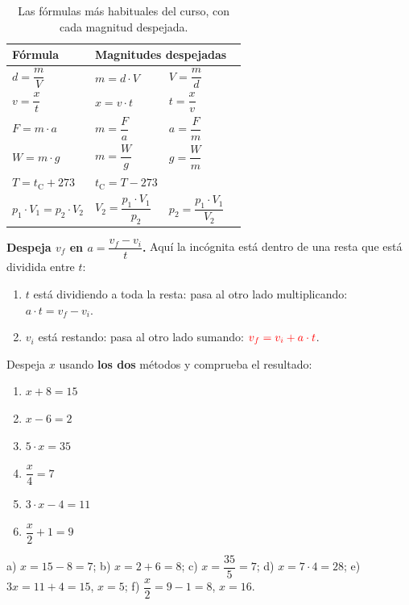 \begin{table}[H]
    \centering
    \renewcommand{\arraystretch}{2.2}
    \begin{tabular}{llll}
        \toprule
        \textbf{Fórmula} & \multicolumn{3}{l}{\textbf{Magnitudes despejadas}} \\
        \midrule
         \(d = \dfrac{m}{V}\) & \(m = d \cdot V\) & \(V = \dfrac{m}{d}\) & \\
        \(v = \dfrac{x}{t}\) & \(x = v \cdot t\) & \(t = \dfrac{x}{v}\) & \\
        \(F = m \cdot a\) & \(m = \dfrac{F}{a}\) & \(a = \dfrac{F}{m}\) & \\
        \(W = m \cdot g\) & \(m = \dfrac{W}{g}\) & \(g = \dfrac{W}{m}\) & \\
        \(T = t_{\text{C}} + 273\) & \(t_{\text{C}} = T - 273\) & & \\
        \(p_1 \cdot V_1 = p_2 \cdot V_2\) & \(V_2 = \dfrac{p_1 \cdot V_1}{p_2}\) & \(p_2 = \dfrac{p_1 \cdot V_1}{V_2}\) & \\
        \bottomrule
    \end{tabular}
    \caption{Las fórmulas más habituales del curso, con cada magnitud despejada.}
    \label{tab:u0_formulas}
\end{table}

\begin{example}
    \textbf{Despeja \(v_f\) en \(a = \dfrac{v_f - v_i}{t}\).} Aquí la incógnita está dentro de una resta que está dividida entre \(t\):
    \begin{enumerate}[label=\numberballmDarkTeal]
        \item \(t\) está dividiendo a toda la resta: pasa al otro lado multiplicando: \(a \cdot t = v_f - v_i\).
        \item \(v_i\) está restando: pasa al otro lado sumando: \(\textcolor{red}{v_f = v_i + a \cdot t}\).
    \end{enumerate}
\end{example}

\begin{exercise}
    Despeja \(x\) usando \textbf{los dos} métodos y comprueba el resultado:
    \begin{enumerate}[label=\letraminuscula]
        \item \(x + 8 = 15\)
        \item \(x - 6 = 2\)
        \item \(5 \cdot x = 35\)
        \item \(\dfrac{x}{4} = 7\)
        \item \(3 \cdot x - 4 = 11\)
        \item \(\dfrac{x}{2} + 1 = 9\)
    \end{enumerate}
    \begin{solu}
        a) \(x = 15 - 8 = 7\); b) \(x = 2 + 6 = 8\); c) \(x = \dfrac{35}{5} = 7\); d) \(x = 7 \cdot 4 = 28\); e) \(3x = 11 + 4 = 15\), \(x = 5\); f) \(\dfrac{x}{2} = 9 - 1 = 8\), \(x = 16\).
    \end{solu}
\end{exercise}

